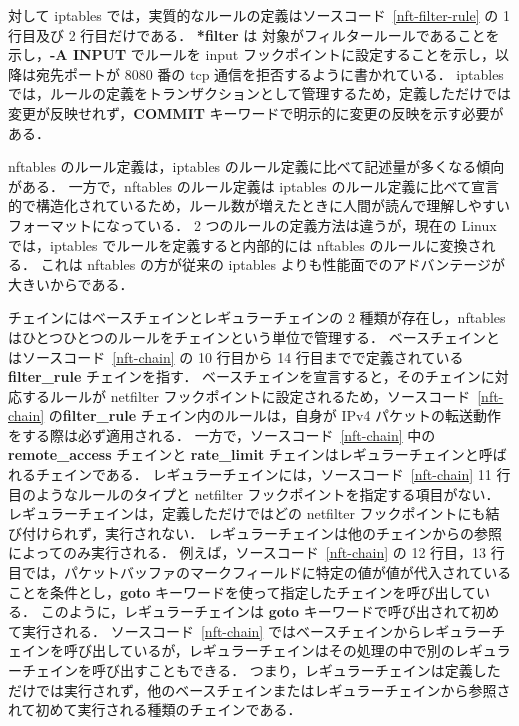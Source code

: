 対して iptables では，実質的なルールの定義はソースコード~\ref*{nft-filter-rule} の 1 行目及び 2 行目だけである．
\textbf{*filter} は 対象がフィルタールールであることを示し，\textbf{-A INPUT} でルールを input フックポイントに設定することを示し，以降は宛先ポートが 8080 番の tcp 通信を拒否するように書かれている．
iptables では，ルールの定義をトランザクションとして管理するため，定義しただけでは変更が反映せれず，\textbf{COMMIT} キーワードで明示的に変更の反映を示す必要がある．

nftables のルール定義は，iptables のルール定義に比べて記述量が多くなる傾向がある．
一方で，nftables のルール定義は iptables のルール定義に比べて宣言的で構造化されているため，ルール数が増えたときに人間が読んで理解しやすいフォーマットになっている．
2 つのルールの定義方法は違うが，現在の Linux では，iptables でルールを定義すると内部的には nftables のルールに変換される．
これは nftables の方が従来の iptables よりも性能面でのアドバンテージが大きいからである．

チェインにはベースチェインとレギュラーチェインの 2 種類が存在し，nftables はひとつひとつのルールをチェインという単位で管理する．
ベースチェインとはソースコード~\ref*{nft-chain} の 10 行目から 14 行目までで定義されている \textbf{filter\_rule} チェインを指す．
ベースチェインを宣言すると，そのチェインに対応するルールが netfilter フックポイントに設定されるため，ソースコード~\ref*{nft-chain} の\textbf{filter\_rule} チェイン内のルールは，自身が IPv4 パケットの転送動作をする際は必ず適用される．
一方で，ソースコード~\ref*{nft-chain} 中の \textbf{remote\_access} チェインと \textbf{rate\_limit} チェインはレギュラーチェインと呼ばれるチェインである．
レギュラーチェインには，ソースコード~\ref*{nft-chain} 11 行目のようなルールのタイプと netfilter フックポイントを指定する項目がない．
レギュラーチェインは，定義しただけではどの netfilter フックポイントにも結び付けられず，実行されない．
レギュラーチェインは他のチェインからの参照によってのみ実行される．
例えば，ソースコード~\ref*{nft-chain} の 12 行目，13 行目では，パケットバッファのマークフィールドに特定の値が値が代入されていることを条件とし，\textbf{goto} キーワードを使って指定したチェインを呼び出している．
このように，レギュラーチェインは \textbf{goto} キーワードで呼び出されて初めて実行される．
ソースコード~\ref*{nft-chain} ではベースチェインからレギュラーチェインを呼び出しているが，レギュラーチェインはその処理の中で別のレギュラーチェインを呼び出すこともできる．
つまり，レギュラーチェインは定義しただけでは実行されず，他のベースチェインまたはレギュラーチェインから参照されて初めて実行される種類のチェインである．

